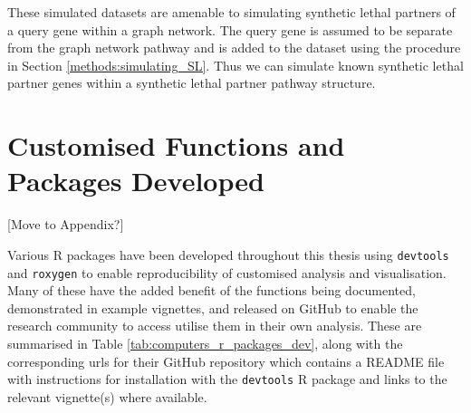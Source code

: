 These simulated datasets are amenable to simulating synthetic lethal partners of a query gene within a graph network. The query gene is assumed to be separate from the graph network pathway and is added to the dataset using the procedure in Section \ref{methods:simulating_SL}. Thus we can simulate known synthetic lethal partner genes within a synthetic lethal partner pathway structure.

\iffalse

	\texttt{[image: \{"/home/tomkelly/Documents/PhD Otago Uni/SL\_Model/graph\_sim\_method/dist\_mat".png]}}
	\texttt{[image: \{"/home/tomkelly/Documents/PhD Otago Uni/SL\_Model/graph\_sim\_method/sigma\_mat".png]}}
		\texttt{[image: \{"/home/tomkelly/Documents/PhD Otago Uni/SL\_Model/graph\_sim\_method/expr\_mat".png]}}
			\texttt{[image: \{"/home/tomkelly/Documents/PhD Otago Uni/SL\_Model/graph\_sim\_method/expr\_cor\_mat".png]}}
		\texttt{[image: \{"/home/tomkelly/Documents/PhD Otago Uni/SL\_Model/graph\_sim\_method/expr\_disc\_mat".png]}}
		
	\texttt{[image: \{"/home/tomkelly/Documents/PhD Otago Uni/SL\_Model/graph\_sim\_method/state\_matrix\_inhibiting".png]}}
	\texttt{[image: \{"/home/tomkelly/Documents/PhD Otago Uni/SL\_Model/graph\_sim\_method/dist\_mat".png]}}
		\texttt{[image: \{"/home/tomkelly/Documents/PhD Otago Uni/SL\_Model/graph\_sim\_method/sigma\_mat\_inhibiting".png]}}
		\texttt{[image: \{"/home/tomkelly/Documents/PhD Otago Uni/SL\_Model/graph\_sim\_method/expr\_inhib\_mat".png]}}
			\texttt{[image: \{"/home/tomkelly/Documents/PhD Otago Uni/SL\_Model/graph\_sim\_method/expr\_inhib\_cor\_mat".png]}}
		\texttt{[image: \{"/home/tomkelly/Documents/PhD Otago Uni/SL\_Model/graph\_sim\_method/expr\_inhib\_disc\_mat".png]}}
	
\fi	

\section{Customised Functions and Packages Developed} \label{methods:r_packages}

[Move to Appendix?]

Various R packages have been developed throughout this thesis using \texttt{devtools} \citep{devtools} and \texttt{roxygen} \citep{roxygen} to enable reproducibility of customised analysis and visualisation. Many of these have the added benefit of the functions being documented, demonstrated in example vignettes, and released on GitHub to enable the research community to access utilise them in their own analysis. These are summarised in Table \ref{tab:computers_r_packages_dev}, along with the corresponding urls for their GitHub repository which contains a README file with instructions for installation with the \texttt{devtools} R package \citep{devtools} and links to the relevant vignette(s) where available.

